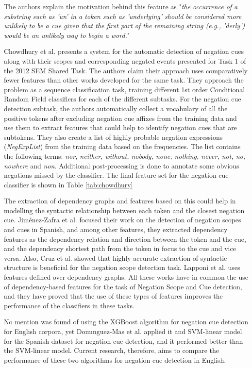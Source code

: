 The authors explain the motivation behind this feature as "\textit{the occurrence of a substring such as 'un' in a token such as 'underlying' should be considered more unlikely to be a cue given that the first part of the remaining string (e.g., 'derly') would be an unlikely way to begin a word.}"

Chowdhury et al. \cite{chowdhury2012fbk} presents a system for the automatic detection of negation cues along with their scopes and corresponding negated events presented for Task 1 of the 2012 SEM Shared Task. The authors claim their approach uses comparatively fewer features than other works developed for the same task. They approach the problem as a sequence classification task, training different 1st order Conditional Random Field classifiers for each of the different subtasks. 
For the negation cue detection subtask, the authors automatically collect a vocabulary of all the positive tokens after excluding negation cue affixes from the training data and use them to extract features that could help to identify negation cues that are subtokens. They also create a list of highly probable negation expressions (\textit{NegExpList}) from the training data based on the frequencies. The list contains the following terms: \textit{nor, neither, without, nobody, none, nothing, never, not, no, nowhere} and  \textit{non}. Additional post-processing is done to annotate some obvious negations missed by the classifier. The final feature set for the negation cue classifier is shown in Table \ref{tab:chowdhury}

The extraction of dependency graphs and features based on this could help in modelling the syntactic relationship between each token and the closest negation cue. Jiménez-Zafra et al.\cite{jimenez2020detecting} focused their work on the detection of negation scopes and cues in Spanish, and among other features, they extracted dependency features as the dependency relation and direction between the token and the cue, and the dependency shortest path from the token in focus to the cue and vice versa. Also, Cruz et al.\cite{cruz2016machine} showed that highly accurate extraction of syntactic structure is beneficial for the negation scope detection task. Lapponi et al.  \cite{lapponi2012uio} uses features defined over dependency graphs. All these works have in common the use of dependency-based features for the task of Negation Scope and Cue detection, and they have proved that the use of these types of features improves the performance of the classifiers in these tasks.

No mention was found of using the XGBoost algorithm for negation cue detection for English corpora, yet Domınguez-Mas et al. \cite{xgb2019} applied it and SVM-linear model for the Spanish dataset for negation cue detection, and it performed better than the SVM-linear model. Current research, therefore, aims to compare the performance of these two algorithms for negation cue detection in English.